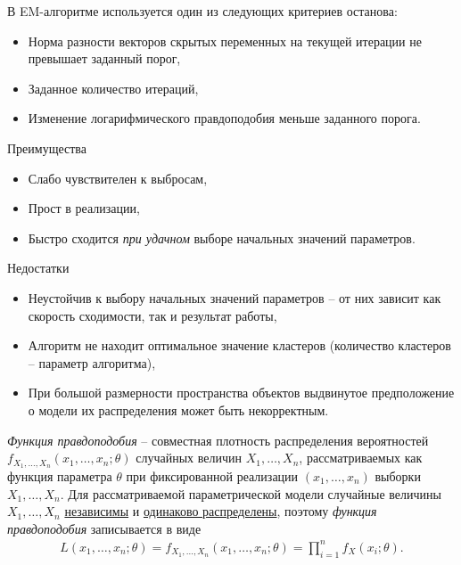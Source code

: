 \documentclass[%
	11pt,
	a4paper,
	utf8,
		]{article}
\begin{document}
В EM-алгоритме используется один из следующих критериев останова:
\begin{itemize}
	\item Норма разности векторов скрытых переменных на текущей итерации не превышает заданный порог,
	
	\item Заданное количество итераций,
	
	\item Изменение логарифмического правдоподобия меньше заданного порога.
\end{itemize}

Преимущества
\begin{itemize}
	\item Слабо чувствителен к выбросам,
	
	\item Прост в реализации,
	
	\item Быстро сходится \emph{при удачном} выборе начальных значений параметров.
\end{itemize}

Недостатки
\begin{itemize}
	\item Неустойчив к выбору начальных значений параметров -- от них зависит как скорость сходимости, так и результат работы,
	
	\item Алгоритм не находит оптимальное значение кластеров (количество кластеров -- параметр алгоритма),
	
	\item При большой размерности пространства объектов выдвинутое предположение о модели их распределения может быть некорректным.
\end{itemize}


\emph{Функция правдоподобия} -- совместная плотность распределения вероятностей $ f_{X_1, \ldots, X_n}(x_1, \ldots, x_n; \theta) $ случайных величин $ X_1, \ldots, X_n $, рассматриваемых как функция параметра $ \theta $ при фиксированной реализации $ (x_1, \ldots, x_n) $ выборки $ X_1, \ldots, X_n $. Для рассматриваемой параметрической модели случайные величины $ X_1, \ldots, X_n $ \underline{независимы} и \underline{одинаково распределены}, поэтому \emph{функция правдоподобия} записывается в виде \cite{shulenin-ch1}
\begin{align*}
	L(x_1, \ldots, x_n; \theta) = f_{X_1, \ldots, X_n}(x_1, \ldots, x_n; \theta) = \prod_{i=1}^{n} f_X(x_i; \theta).
\end{align*}
\end{document}
